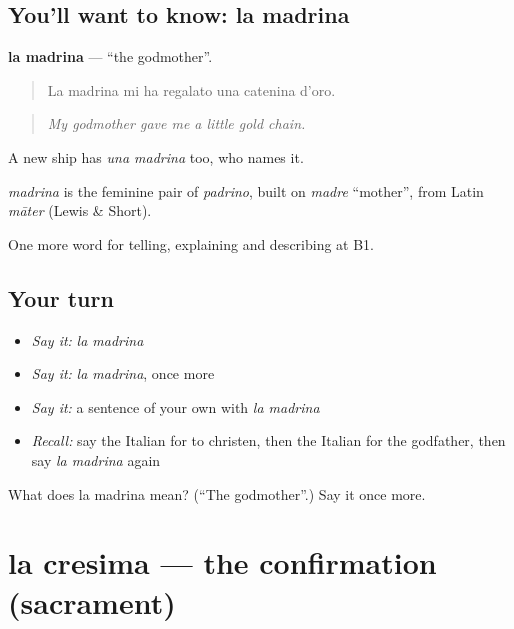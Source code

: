 \subsection*{You'll want to know: la madrina}
\textbf{la madrina} — \textquotedblleft{}the godmother\textquotedblright{}.

\begin{quote}
La madrina mi ha regalato una catenina d'oro.
\end{quote}

\begin{quote}
\emph{My godmother gave me a little gold chain.}
\end{quote}

A new ship has \emph{una madrina} too, who names it.

\begin{cousinweb}
\emph{madrina} is the feminine pair of \emph{padrino}, built on \emph{madre} \textquotedblleft{}mother\textquotedblright{}, from Latin \emph{māter} (Lewis \& Short).
\end{cousinweb}

\begin{grammarlens}[title={What you've built}]
One more word for telling, explaining and describing at B1.
\end{grammarlens}

\subsection*{Your turn}
\begin{itemize}
\raggedright
  \item \emph{Say it:} \emph{la madrina}
  \item \emph{Say it:} \emph{la madrina}, once more
  \item \emph{Say it:} a sentence of your own with \emph{la madrina}
  \item \emph{Recall:} say the Italian for to christen, then the Italian for the godfather, then say \emph{la madrina} again
\end{itemize}

\begin{tcolorbox}[breakable,colback=teal!4,colframe=teal!35!black,title={Before you move on}]
What does la madrina mean? (\textquotedblleft{}The godmother\textquotedblright{}.) Say it once more.
\end{tcolorbox}
\section[la cresima]{la cresima — the confirmation (sacrament)}

